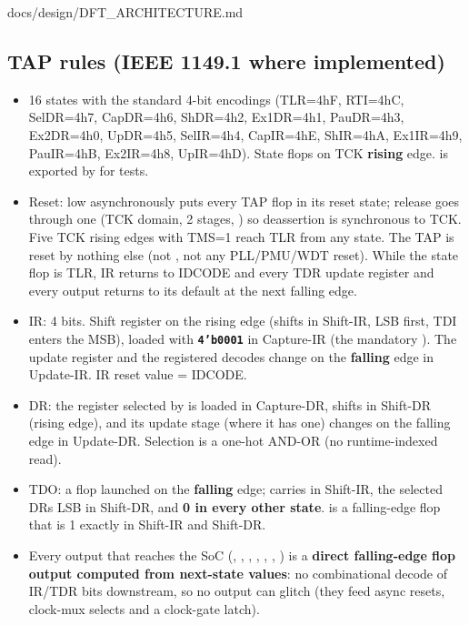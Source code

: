 \begin{relocated}{docs/design/DFT_ARCHITECTURE.md}
\subsection{TAP rules (IEEE 1149.1 where implemented)}\label{tm:ch:dft-architecture:152-tap-rules-ieee-11491-where-implemented}

\begin{itemize}
\tightlist
\item
  16 states with the standard 4-bit encodings (TLR=4\textquotesingle hF,
  RTI=4\textquotesingle hC, SelDR=4\textquotesingle h7,
  CapDR=4\textquotesingle h6, ShDR=4\textquotesingle h2,
  Ex1DR=4\textquotesingle h1, PauDR=4\textquotesingle h3,
  Ex2DR=4\textquotesingle h0, UpDR=4\textquotesingle h5,
  SelIR=4\textquotesingle h4, CapIR=4\textquotesingle hE,
  ShIR=4\textquotesingle hA, Ex1IR=4\textquotesingle h9,
  PauIR=4\textquotesingle hB, Ex2IR=4\textquotesingle h8,
  UpIR=4\textquotesingle hD). State flops on TCK \textbf{rising} edge.
   is exported by  for tests.
\item
  Reset:  low asynchronously puts every TAP flop in its
  reset state; release goes through one  (TCK
  domain, 2 stages, ) so deassertion is synchronous
  to TCK. Five TCK rising edges with TMS=1 reach TLR from any state. The
  TAP is reset by nothing else (not , not any
  PLL/\allowbreak{}PMU/\allowbreak{}WDT reset). While the state flop is
  TLR, IR returns to IDCODE and every TDR update register and every
  output returns to its default at the next falling edge.
\item
  IR: 4 bits. Shift register on the rising edge (shifts in Shift-IR, LSB
  first, TDI enters the MSB), loaded with \textbf{\texttt{4'b0001}} in
  Capture-IR (the mandatory ). The update register
   and the registered decodes change on the \textbf{falling}
  edge in Update-IR. IR reset value = IDCODE.
\item
  DR: the register selected by  is loaded in Capture-DR,
  shifts in Shift-DR (rising edge), and its update stage (where it has
  one) changes on the falling edge in Update-DR. Selection is a one-hot
  AND-OR (no runtime-indexed read).
\item
  TDO: a flop launched on the \textbf{falling} edge; carries
   in Shift-IR, the selected DR\textquotesingle s LSB
  in Shift-DR, and \textbf{0 in every other state}.  is a
  falling-edge flop that is 1 exactly in Shift-IR and Shift-DR.
\item
  Every  output that reaches the SoC (,
  , , ,
  , , ) is a \textbf{direct
  falling-edge flop output computed from next-state values}: no
  combinational decode of IR/TDR bits downstream, so no output can
  glitch (they feed async resets, clock-mux selects and a clock-gate
  latch).
\end{itemize}


\end{relocated}
